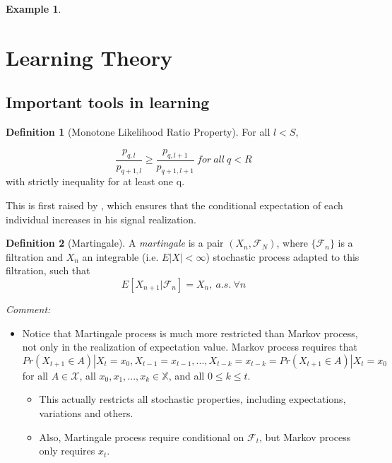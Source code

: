 \documentclass{book}
\theoremstyle{plain}
\theoremstyle{definition}
\newtheorem{defn}{Definition}[section] %
\newtheorem{exmp}{Example}[section] %
\newcommand{\F}{\mathcal{F}}
\begin{document}
\begin{exmp}

\end{exmp}




\section{Learning Theory} %
\label{sec:learning_theory}

\subsection{Important tools in learning} %
\label{sub:important_tools_in_learning}

\begin{defn}[Monotone Likelihood Ratio Property]
For all $l<S$,

\[\frac{p_{q,l}}{p_{q+1,l}} \geq \frac{p_{q,l+1}}{p_{q+1,l+1}} \ for \ all \ q<R\]
with strictly inequality for at least one q.

\end{defn}

This is first raised by \cite{Milgrom:1981dv}, which ensures that the conditional expectation of each individual increases in his signal realization.

\begin{defn}[Martingale]
A \textit{martingale} is a pair $(X_n,\F_N)$, where $\{\F_n\}$ is a filtration and $X_n$ an integrable (i.e. $E|X|<\infty$) stochastic process adapted to this filtration, such that 
\[E[X_{n+1}|\mathcal{F}_n]=X_n,\ a.s. \ \forall n\]
\end{defn}

\noindent
\textit{Comment:}
\begin{itemize}
	\setlength{\itemsep}{0pt}
	\item Notice that Martingale process is much more restricted than Markov process, not only in the realization of expectation value. Markov process requires that 
	\[Pr(X_{t+1}\in A)|X_t=x_0,X_{t-1}=x_{t-1},...,X_{t-k}=x_{t-k}
	=Pr(X_{t+1}\in A)|X_t=x_0\]
	for all $A \in \mathcal{X}$, all $x_0,x_1,...,x_k \in \mathbb{X}$, and all $0\leq k\leq t$. 
	\begin{itemize}
		\item This actually restricts all stochastic properties, including expectations, variations and others.
		\item Also, Martingale process require conditional on $\F_t$, but Markov process only requires $x_t$.
	\end{itemize}
\end{itemize}
\end{document}
